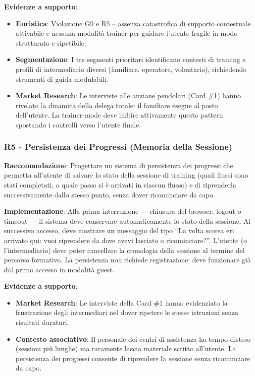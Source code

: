 \documentclass[11pt,a4paper]{article}
\begin{document}
\textbf{Evidenze a supporto}:
\begin{itemize}
    \item \textbf{Euristica}: Violazione G9 e R5 -- assenza catastrofica di
    supporto contestuale attivabile e nessuna modalit\`a trainer per guidare
    l'utente fragile in modo strutturato e ripetibile.
    \item \textbf{Segmentazione}: I tre segmenti prioritari identificano
    contesti di training e profili di intermediario diversi (familiare,
    operatore, volontario), richiedendo strumenti di guida modulabili.
    \item \textbf{Market Research}: Le interviste alle anziane pendolari
    (Card \#1) hanno rivelato la dinamica della delega totale: il familiare
    esegue al posto dell'utente. La trainer-mode deve inibire attivamente
    questo pattern spostando i controlli verso l'utente finale.
\end{itemize}

\subsubsection{R5 - Persistenza dei Progressi (Memoria della Sessione)}
\label{rec:R5}

\textbf{Raccomandazione}: Progettare un sistema di persistenza dei progressi
che permetta all'utente di salvare lo stato della sessione di training (quali
flussi sono stati completati, a quale passo si \`e arrivati in ciascun flusso)
e di riprenderla successivamente dallo stesso punto, senza dover ricominciare
da capo.

\textbf{Implementazione}: Alla prima interruzione — chiusura del browser,
logout o timeout — il sistema deve conservare automaticamente lo stato della
sessione. Al successivo accesso, deve mostrare un messaggio del tipo ``La
volta scorsa eri arrivato qui: vuoi riprendere da dove avevi lasciato o
ricominciare?''. L'utente (o l'intermediario) deve poter cancellare la cronologia
della sessione al termine del percorso formativo. La persistenza non richiede
registrazione: deve funzionare gi\`a dal primo accesso in modalit\`a guest.

\textbf{Evidenze a supporto}:
\begin{itemize}
    \item \textbf{Market Research}: Le interviste della Card \#1 hanno
    evidenziato la frustrazione degli intermediari nel dover ripetere
    le stesse istruzioni senza risultati duraturi.
    \item \textbf{Contesto associativo}: Il personale dei centri di
    assistenza ha tempo disteso (sessioni pi\`u lunghe) ma raramente lascia
    materiale scritto all'utente. La persistenza dei progressi consente
    di riprendere la sessione senza ricominciare da capo.
\end{itemize}
\end{document}
